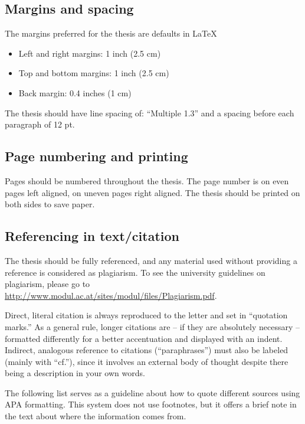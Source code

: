 \subsection{Margins and spacing}
\label{sec:margins}

The margins preferred for the thesis are defaults in \LaTeX\:
\begin{itemize}
\item Left and right margins: 1 inch (2.5 cm)
\item Top and bottom margins: 1 inch (2.5 cm)
\item Back margin: 0.4 inches (1 cm)
\end{itemize}
	
The thesis should have line spacing of: “Multiple 1.3” and a spacing before each paragraph of 12 pt. 

\subsection{Page numbering and printing}
\label{sec:pagenumbering}

Pages should be numbered throughout the thesis. The page number is on even pages left aligned, on uneven pages right aligned. The thesis should be printed on both sides to save paper. 

\subsection{Referencing in text/citation}
\label{sec:referencing}
The thesis should be fully referenced, and any material used without providing a reference is considered as plagiarism. 
To see the university guidelines on plagiarism, please go to \url{http://www.modul.ac.at/sites/modul/files/Plagiarism.pdf}.

Direct, literal citation is always reproduced to the letter and set in “quotation marks.” As a general rule, longer citations are – if they are absolutely necessary – 
formatted differently for a better accentuation and displayed with an indent. Indirect, analogous reference to citations (“paraphrases”) must also be 
labeled (mainly with “cf.”), since it involves an external body of thought despite there being a description in your own words. 

The following list serves as a 
guideline about how to quote different sources using APA formatting. 
This system does not use footnotes, but it offers a brief note in the text about where the information comes from.

